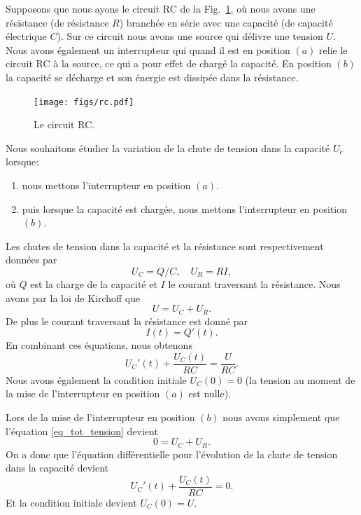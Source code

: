 \documentclass[a4paper,12pt]{book}
\begin{document}
Supposons que nous ayons le circuit RC de la Fig.~\ref{fig_rc}, où nous avons une résistance (de résistance $R$) branchée en série avec une capacité 
(de capacité électrique $C$). Sur ce circuit nous avons une source qui délivre une tension $U$. Nous avons également un interrupteur qui 
quand il est en position $(a)$ relie le circuit RC à la source, ce qui a pour effet de chargé la capacité. En position $(b)$ 
la capacité se décharge et son énergie est dissipée dans la résistance.
\begin{figure}[htp]
\begin{center}
\texttt{[image: figs/rc.pdf]}
\caption{Le circuit RC.}\label{fig_rc}
\end{center}
\end{figure}
Nous souhaitons étudier la variation de la chute de tension dans la capacité $U_c$ lorsque:
\begin{enumerate}
 \item nous mettons l'interrupteur en position $(a)$.
 \item puis lorsque la capacité est chargée, nous mettons l'interrupteur en position $(b)$.
\end{enumerate}
Les chutes de tension dans la capacité et la résistance sont respectivement données par
\begin{equation}
 U_C=Q/C,\quad U_R=R I,
\end{equation}
où $Q$ est la charge de la capacité et $I$ le courant traversant la résistance. Nous avons par la loi de Kirchoff
que
\begin{equation}
 U=U_C+U_R.\label{eq_tot_tension}
\end{equation}
De plus le courant traversant la résistance est donné par 
\begin{equation}
 I(t)=Q'(t).
\end{equation}
En combinant ces équations, nous obtenons 
\begin{equation}
 U_C'(t)+\frac{U_C(t)}{RC}=\frac{U}{RC}.
\end{equation}
Nous avons également la condition initiale $U_C(0)=0$ (la tension au moment de la mise de l'interrupteur en position $(a)$ est nulle).

Lors de la mise de l'interrupteur en position $(b)$ nous avons simplement que l'équation \eqref{eq_tot_tension} devient
\begin{equation}
 0=U_C+U_R.\label{eq_tot_tension_0}
\end{equation}
On a donc que l'équation différentielle pour l'évolution de la chute de tension dans la capacité devient 
\begin{equation}
 U_C'(t)+\frac{U_C(t)}{RC}=0.
\end{equation}
Et la condition initiale devient $U_C(0)=U$.
\end{document}
